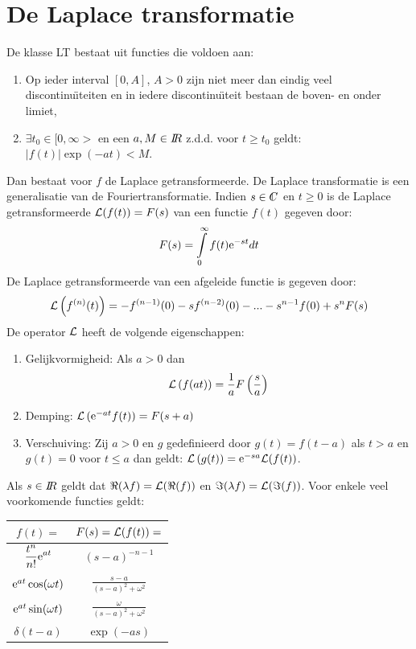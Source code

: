 \documentclass[twoside]{report}
\begin{document}
\section{De Laplace transformatie}
De klasse LT bestaat uit functies die voldoen aan:
\begin{enumerate}
\item Op ieder interval $[0,A]$, $A>0$ zijn niet meer dan eindig veel
      discontinu\"{\i}teiten en in iedere discontinu\"{\i}teit bestaan de
      boven- en onder limiet,
\item $\exists t_0\in[0,\infty>$ en een $a,M\in I\hspace{-1mm}R$ z.d.d. voor $t\geq t_0$
      geldt: $|f(t)|\exp(-at)<M$.
\end{enumerate}
Dan bestaat voor $f$ de Laplace getransformeerde.
\npar
De Laplace transformatie is een generalisatie van de Fouriertransformatie.
Indien $s\in\CC$ en $t\geq0$ is de Laplace getransformeerde
${\cal L}(f(t))=F(s)$ van een functie $f(t)$ gegeven door:
\[
F(s)=\int\limits_0^\infty f(t){\rm e}^{-st}dt
\]
De Laplace getransformeerde van een afgeleide functie is gegeven door:
\[
{\cal L}\left(f^{(n)}(t)\right)=-f^{(n-1)}(0)-sf^{(n-2)}(0)-...-s^{n-1}f(0)+s^nF(s)
\]
De operator $\cal L$ heeft de volgende eigenschappen:
\begin{enumerate}
\item Gelijkvormigheid: Als $a>0$ dan
\[
{\cal L}\left(f(at)\right)=\frac{1}{a}F\left(\frac{s}{a}\right)
\]
\item Demping: ${\cal L}\left({\rm e}^{-at}f(t)\right)=F(s+a)$
\item Verschuiving: Zij $a>0$ en $g$ gedefinieerd door $g(t)=f(t-a)$ als
$t>a$ en $g(t)=0$ voor $t\leq a$ dan geldt:
${\cal L}\left(g(t)\right)={\rm e}^{-sa}{\cal L}(f(t))$.
\end{enumerate}
Als $s\in I\hspace{-1mm}R$ geldt dat $\Re(\lambda f)={\cal L}(\Re(f))$ en
$\Im(\lambda f)={\cal L}(\Im(f))$.
\npar
Voor enkele veel voorkomende functies geldt:
\begin{center}
\begin{tabular}{||c||c||}
\hline
$f(t)=$&$F(s)={\cal L}(f(t))=$\\
\hline
\hline
$\displaystyle\frac{t^n}{n!}{\rm e}^{at}$&$(s-a)^{-n-1}$\rule{0pt}{15pt}\\
${\rm e}^{at}\cos(\omega t)$&$\displaystyle\frac{s-a}{(s-a)^2+\omega^2}$\rule{0pt}{15pt}\\
${\rm e}^{at}\sin(\omega t)$&$\displaystyle\frac{\omega}{(s-a)^2+\omega^2}$\rule{0pt}{15pt}\\
$\delta(t-a)$&$\exp(-as)$\rule{0pt}{13pt}\\
\hline
\end{tabular}
\end{center}
\end{document}
